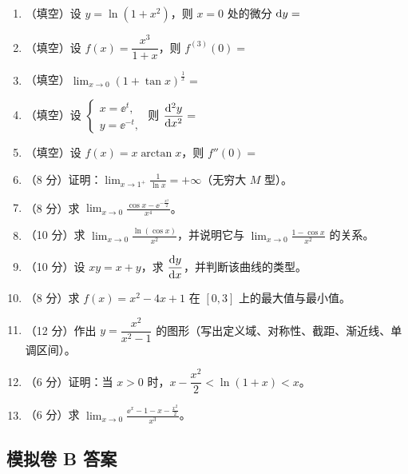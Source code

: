 \begin{enumerate}[label=\textbf{B\arabic*.}]
  \item （填空）设 $y=\ln(1+x^{2})$，则 $x=0$ 处的微分 $\mathrm{d} y=$ \underline{\hspace{2.5cm}}
  \item （填空）设 $f(x)=\dfrac{x^{3}}{1+x}$，则 $f^{(3)}(0)=$ \underline{\hspace{2.5cm}}
  \item （填空）$\displaystyle\lim_{x\to0}\left(1+\tan x\right)^{\frac1x}=$ \underline{\hspace{2.5cm}}
  \item （填空）设 $\begin{cases}x=\ee^{t},\\ y=\ee^{-t},\end{cases}$ 则 $\dfrac{\mathrm{d}^{2}y}{\mathrm{d} x^{2}}=$ \underline{\hspace{2.5cm}}
  \item （填空）设 $f(x)=x\arctan x$，则 $f''(0)=$ \underline{\hspace{2.5cm}}
  \item （8 分）证明：$\displaystyle\lim_{x\to1^{+}}\frac{1}{\ln x}=+\infty$（无穷大 $M$ 型）。
  \item （8 分）求 $\displaystyle\lim_{x\to0}\frac{\cos x-\ee^{-\frac{x^{2}}{2}}}{x^{4}}$。
  \item （10 分）求 $\displaystyle\lim_{x\to0}\frac{\ln(\cos x)}{x^{2}}$，并说明它与 $\displaystyle\lim_{x\to0}\frac{1-\cos x}{x^{2}}$ 的关系。
  \item （10 分）设 $xy=x+y$，求 $\dfrac{\mathrm{d} y}{\mathrm{d} x}$，并判断该曲线的类型。
  \item （8 分）求 $f(x)=x^{2}-4x+1$ 在 $[0,3]$ 上的最大值与最小值。
  \item （12 分）作出 $y=\dfrac{x^{2}}{x^{2}-1}$ 的图形（写出定义域、对称性、截距、渐近线、单调区间）。
  \item （6 分）证明：当 $x>0$ 时，$x-\dfrac{x^{2}}{2}<\ln(1+x)<x$。
  \item （6 分）求 $\displaystyle\lim_{x\to0}\frac{\ee^{x}-1-x-\frac{x^{2}}{2}}{x^{3}}$。
\end{enumerate}

\subsection{模拟卷 B 答案}

